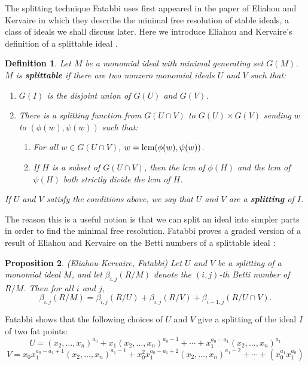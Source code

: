 \documentclass{article}
\begin{document}
The splitting technique Fatabbi uses first appeared in the paper of Eliahou and Kervaire \cite{EK} in which they describe the minimal free resolution of stable ideals, a class of ideals we shall discuss later. Here we introduce Eliahou and Kervaire's definition of a splittable ideal \cite{EK}.

\newtheorem{definition}{Definition}[section]
\begin{definition}
\label{splitdef}
Let $M$ be a monomial ideal with minimal generating set $G(M)$. $M$ is \textbf{splittable} if there are two nonzero monomial ideals $U$ and $V$ such that:
\begin{enumerate}
\item $G(I)$ is the disjoint union of $G(U)$ and $G(V)$.
\item There is a splitting function from $G(U \cap V)$ to $G(U) \times G(V)$ sending $w$ to $(\phi(w),\psi(w))$ such that:
\begin{enumerate}
\item For all $w \in G(U \cap V)$, $w=\hbox{lcm}(\phi(w),\psi(w))$.
\item If $H$ is a subset of $G(U \cap V)$, then the lcm of $\phi(H)$ and the lcm of $\psi(H)$ both strictly divide the lcm of $H$.
\end{enumerate}
\end{enumerate}
If $U$ and $V$ satisfy the conditions above, we say that $U$ and $V$ are a \textbf{splitting} of $I$.
\end{definition}

The reason this is a useful notion is that we can split an ideal into simpler parts in order to find the minimal free resolution. Fatabbi proves a graded version of a result of Eliahou and Kervaire on the Betti numbers of a splittable ideal \cite{Fatabbi}:

\newtheorem{proposition}[definition]{Proposition}
\begin{proposition}
\label{splitbetti}
\emph{(Eliahou-Kervaire, Fatabbi)} Let $U$ and $V$ be a splitting of a monomial ideal $M$, and let $\beta_{i,j}(R/M)$ denote the $(i,j)$-th Betti number of $R/M$. Then for all $i$ and $j$, \[\beta_{i,j}(R/M) = \beta_{i,j}(R/U) + \beta_{i,j}(R/V) + \beta_{i-1,j}(R/U \cap V).\]
\end{proposition}

Fatabbi shows that the following choices of $U$ and $V$ give a splitting of the ideal $I$ of two fat points: \[ U =(x_2, \dots, x_n)^{a_0}+x_1(x_2,\dots,x_n)^{a_0-1}+\cdots + x_1^{a_0-a_1}(x_2,\dots,x_n)^{a_1} \] \[ V=x_0x_1^{a_0-a_1+1}(x_2,\dots,x_n)^{a_1-1}+x_0^2x_1^{a_0-a_1+2}(x_2,\dots,x_n)^{a_1-2} + \cdots+(x_0^{a_1}x_1^{a_0}) \]
\end{document}
